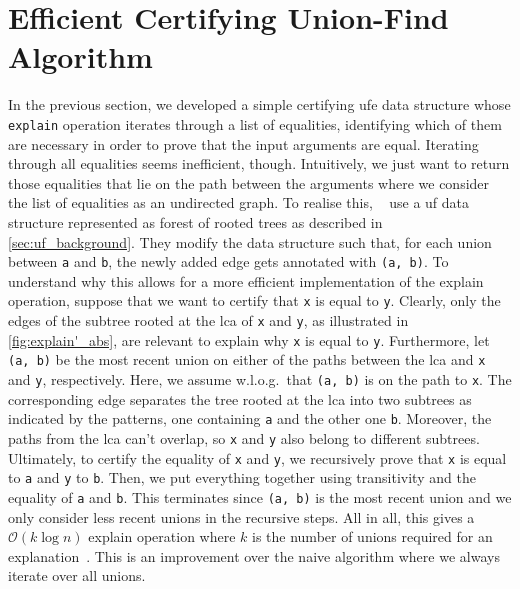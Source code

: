 \documentclass[
  sigplan,
  10pt,
  anonymous,
  review,
  ]{acmart}
\newcommand{\opexplain}{explain}
\begin{document}
\section{Efficient Certifying Union-Find Algorithm\label{sec:ufe_efficient}}
In the previous section, we developed a simple certifying \acrfull{ufe} data structure whose \lstinline|explain| operation iterates through a list of equalities,
identifying which of them are necessary in order to prove that the input arguments are equal.
Iterating through all equalities seems inefficient, though.
Intuitively, we just want to return those equalities that lie on the path between the arguments where we consider the list of equalities as an undirected graph.
To realise this, \citeauthor{congcl_proofs}~\cite{congcl_proofs} use a \acrshort{uf} data structure represented as forest of rooted trees as described in \autoref{sec:uf_background}.
They modify the data structure such that, for each union between \lstinline|a| and \lstinline|b|, the newly added edge gets annotated with \lstinline|(a, b)|.
To understand why this allows for a more efficient implementation of the \opexplain{} operation, suppose that we want to certify that \lstinline|x| is equal to \lstinline|y|.
Clearly, only the edges of the subtree rooted at the \acrfull{lca} of \lstinline|x| and \lstinline|y|, as illustrated in \autoref{fig:explain'_abs}, are relevant to explain why \lstinline|x| is equal to \lstinline|y|.
Furthermore, let \lstinline|(a, b)| be the most recent union on either of the paths between the \acrshort{lca} and \lstinline|x| and \lstinline|y|, respectively.
Here, we assume w.l.o.g.\ that \lstinline|(a, b)| is on the path to \lstinline|x|.
The corresponding edge separates the tree rooted at the \acrshort{lca} into two subtrees as indicated by the patterns,  one containing \lstinline|a| and the other one \lstinline|b|.
Moreover, the paths from the \acrshort{lca} can't overlap, so \lstinline|x| and \lstinline|y| also belong to different subtrees.
Ultimately, to certify the equality of \lstinline|x| and \lstinline|y|, we recursively prove that \lstinline|x| is equal to \lstinline|a| and \lstinline|y| to \lstinline|b|.
Then, we put everything together using transitivity and the equality of \lstinline|a| and \lstinline|b|.
This terminates since \lstinline|(a, b)| is the most recent union and we only consider less recent unions in the recursive steps.
All in all, this gives a $\mathcal{O}(k \log n)$ \opexplain{} operation where $k$ is the number of unions required for an explanation~\cite{congcl_proofs}.
This is an improvement over the naive algorithm where we always iterate over all unions.
\end{document}
